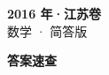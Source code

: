 \documentclass[zihao=-4, a4paper]{ctexart}
\begin{document}
\begin{center}
  {\Large\bfseries 2016 年·江苏卷}\\[4pt]
  {\large 数学 · 简答版}
\end{center}
\medskip
{}

\clearpage
{}
\begin{center}{\Large\bfseries 答案速查}\end{center}
\medskip

\end{document}
